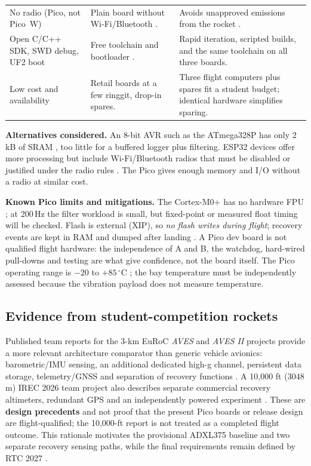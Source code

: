 \begin{longtable}{@{}L{36mm}L{58mm}L{56mm}@{}}
No radio (Pico, not Pico~W) & Plain board without Wi-Fi/Bluetooth \cite{picods}. & Avoids unapproved emissions from the rocket \cite{rtc2027app03}.\\
Open C/C++ SDK, SWD debug, UF2 boot & Free toolchain and bootloader \cite{picosdk}. & Rapid iteration, scripted builds, and the same toolchain on all three boards.\\
Low cost and availability & Retail boards at a few ringgit, drop-in spares. & Three flight computers plus spares fit a student budget; identical hardware simplifies sparing.\\
\end{longtable}
\endgroup %
\normalsize

\textbf{Alternatives considered.} An 8-bit AVR such as the ATmega328P has only 2\,kB of SRAM \cite{atmega328ds}, too little for a buffered logger plus filtering. ESP32 devices offer more processing but include Wi-Fi/Bluetooth radios \cite{esp32ds} that must be disabled or justified under the radio rules \cite{rtc2027app03}. The Pico gives enough memory and I/O without a radio at similar cost.

\textbf{Known Pico limits and mitigations.} The Cortex-M0+ has no hardware FPU \cite{rp2040ds}; at 200\,Hz the filter workload is small, but fixed-point or measured float timing will be checked. Flash is external (XIP), so \emph{no flash writes during flight}; recovery events are kept in RAM and dumped after landing \cite{rp2040ds,picosdk}. A Pico dev board is not qualified flight hardware: the independence of A and B, the watchdog, hard-wired pull-downs and testing are what give confidence, not the board itself. The Pico operating range is $-20$ to $+85\,^{\circ}$C \cite{picods}; the bay temperature must be independently assessed because the vibration payload does not measure temperature.


\subsection*{Evidence from student-competition rockets}
Published team reports for the 3-km EuRoC \emph{AVES} and \emph{AVES II} projects provide a more relevant architecture comparator than generic vehicle avionics: barometric/IMU sensing, an additional dedicated high-g channel, persistent data storage, telemetry/GNSS and separation of recovery functions \cite{astg2021aves,astg2022aves2}. A 10,000 ft ($3048$ m) IREC 2026 team project also describes separate commercial recovery altimeters, redundant GPS and an independently powered experiment \cite{irec2026sovereignty}. These are \textbf{design precedents} and not proof that the present Pico boards or release design are flight-qualified; the 10,000-ft report is not treated as a completed flight outcome. This rationale motivates the provisional ADXL375 baseline and two separate recovery sensing paths, while the final requirements remain defined by RTC 2027 \cite{rtc2027app03}.


